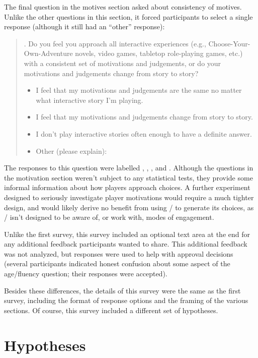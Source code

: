 The final question in the motives section asked about consistency of motives.
%
Unlike the other questions in this section, it forced participants to select a single response (although it still had an ``other'' response):
%
\begin{quote}
  . Do you feel you approach all interactive experiences (e.g., Choose-Your-Own-Adventure novels, video games, tabletop role-playing games, etc.) with a consistent set of motivations and judgements, or do your motivations and judgements change from story to story?
  \begin{itemize}
    \item[\ding{109}] I feel that my motivations and judgements are the same no matter what interactive story I'm playing.
    \item[\ding{109}] I feel that my motivations and judgements change from story to story.
    \item[\ding{109}] I don't play interactive stories often enough to have a definite answer.
    \item[\ding{109}] Other (please explain):
  \end{itemize}
\end{quote}
%
The responses to this question were labelled , , , and .
%
Although the questions in the motivation section weren't subject to any statistical tests, they provide some informal information about how players approach choices.
%
A further experiment designed to seriously investigate player motivations would require a much tighter design, and would likely derive no benefit from using \dunyazad/ to generate its choices, as \dunyazad/ isn't designed to be aware of, or work with, modes of engagement.


Unlike the first survey, this survey included an optional text area at the end for any additional feedback participants wanted to share.
%
This additional feedback was not analyzed, but responses were used to help with approval decisions (several participants indicated honest confusion about some aspect of the age/fluency question; their responses were accepted).


Besides these differences, the details of this survey were the same as the first survey, including the format of response options and the framing of the various sections.
%
Of course, this survey included a different set of hypotheses.

\section{Hypotheses}

